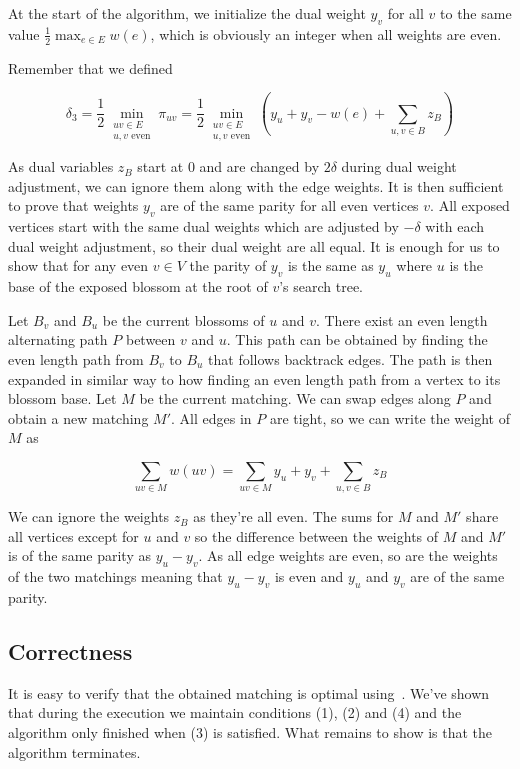 At the start of the algorithm, we initialize the dual weight $y_v$ for all $v$ to the same value $\frac{1}{2}\max_{e \in E} w(e)$, which is obviously an integer when all weights are even.

Remember that we defined

\[\delta_3=\frac{1}{2}\min_{\substack{uv\in E \\ \text{$u, v$ even}}} \pi_{uv} = \frac{1}{2}\min_{\substack{uv\in E \\ \text{$u, v$ even}}} \left(y_u + y_v - w(e) + \sum_{u, v \in B} z_B\right)\] 

As dual variables $z_B$ start at $0$ and are changed by $2\delta$ during dual weight adjustment, we can ignore them along with the edge weights. It is then sufficient to prove that weights $y_v$ are of the same parity for all even vertices $v$. All exposed vertices start with the same dual weights which are adjusted by $-\delta$ with each dual weight adjustment, so their dual weight are all equal. It is enough for us to show that for any even $v \in V$ the parity of $y_v$ is the same as $y_u$ where $u$ is the base of the exposed blossom at the root of $v$'s search tree. 

Let $B_v$ and $B_u$ be the current blossoms of $u$ and $v$. There exist an even length alternating path $P$ between $v$ and $u$. This path can be obtained by finding the even length path from $B_v$ to $B_u$ that follows backtrack edges. The path is then expanded in similar way to how finding an even length path from a vertex to its blossom base. Let $M$ be the current matching. We can swap edges along $P$ and obtain a new matching $M'$. All edges in $P$ are tight, so we can write the weight of $M$ as

\[\sum_{uv \in M} w(uv) = \sum_{uv \in M} y_u + y_v + \sum_{u, v \in B} z_B\]

We can ignore the weights $z_B$ as they're all even. The sums for $M$ and $M'$ share all vertices except for $u$ and $v$ so the difference between the weights of $M$ and $M'$ is of the same parity as $y_u - y_v$. As all edge weights are even, so are the weights of the two matchings meaning that $y_u - y_v$ is even and $y_u$ and $y_v$ are of the same parity.

\subsection{Correctness}

It is easy to verify that the obtained matching is optimal using~. We've shown that during the execution we maintain conditions (1), (2) and (4) and the algorithm only finished when (3) is satisfied. What remains to show is that the algorithm terminates.

